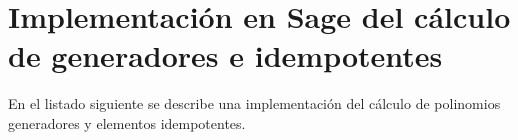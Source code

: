 \chapter[Implementación en Sage del cálculo de generadores e idempotentes]{Implementación en Sage del cálculo de generadores e idempotentes}
\label{annex:sage-gen-idemp}

En el listado siguiente se describe una implementación del cálculo de polinomios generadores y elementos idempotentes.

